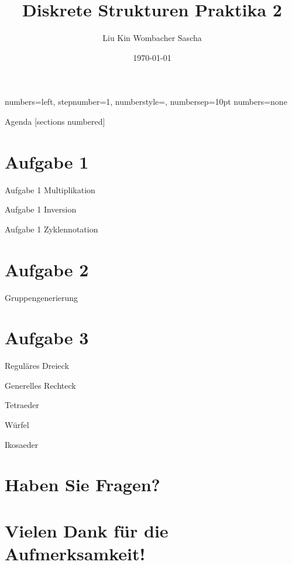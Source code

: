 \documentclass[aspectratio=169]{beamer}
\title{Diskrete Strukturen \newline Praktika 2}
\date{\today}
\author{Liu Kin \newline Wombacher Sascha \newline}
\begin{document}
  {numbers=left, stepnumber=1, numberstyle=\tiny, numbersep=10pt}
  {numbers=none}


  \maketitle
  \begin{frame}{Agenda}
    [sections numbered]
    \tableofcontents[hideallsubsections]
  \end{frame}
  
  
\section{Aufgabe 1}
    \begin{frame}{Aufgabe 1 \newline Multiplikation}
    \end{frame}
    
    \begin{frame}{Aufgabe 1 \newline Inversion}
    \end{frame}
    
    \begin{frame}{Aufgabe 1 \newline Zyklennotation}
    \end{frame}
    
\section{Aufgabe 2}
	\begin{frame}{Gruppengenerierung}
	\end{frame}

\section{Aufgabe 3}
	\begin{frame}{Reguläres Dreieck}
	\end{frame}
	
	\begin{frame}{Generelles Rechteck}
	\end{frame}
	
	\begin{frame}{Tetraeder}
	\end{frame}
	
	\begin{frame}{Würfel}
	\end{frame}
	
	\begin{frame}{Ikosaeder}
	\end{frame}

\section*{Haben Sie Fragen?}
\section*{Vielen Dank für die Aufmerksamkeit!}
  
\end{document}
